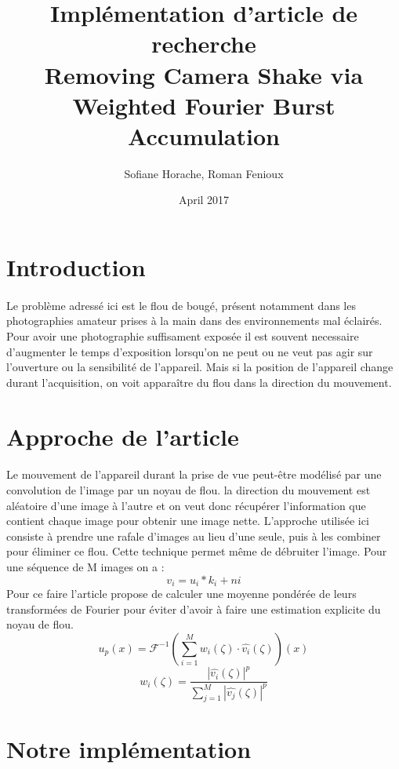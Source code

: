 \documentclass[a4paper,10pt]{report}
\title{Implémentation d'article de recherche \\ 
Removing Camera Shake via Weighted Fourier Burst Accumulation}
\author{Sofiane Horache, Roman Fenioux}
\date{April 2017}
\begin{document}
\maketitle

\setcounter{secnumdepth}{0}

\section{Introduction}
\paragraph{}
Le problème adressé ici est le flou de bougé, présent notamment dans les photographies 
amateur prises à la main dans des environnements mal éclairés. Pour avoir une photographie 
suffisament exposée il est souvent necessaire d'augmenter le temps d'exposition lorsqu'on 
ne peut ou ne veut pas agir sur l'ouverture ou la sensibilité de l'appareil. Mais si la 
position de l'appareil change durant l'acquisition, on voit apparaître du flou dans la direction
du mouvement. 

\section{Approche de l'article}
\paragraph{}
Le mouvement de l'appareil durant la prise de vue peut-être modélisé par une convolution de l'image
par un noyau de flou. la direction du mouvement est aléatoire d'une image à l'autre et on veut donc 
récupérer l'information que contient chaque image pour obtenir une image nette. L'approche utilisée 
ici consiste à prendre une rafale d'images au lieu d'une seule, puis à les combiner pour éliminer ce 
flou. Cette technique permet même de débruiter l'image. Pour une séquence de M images on a :
\[
  v_{i} = u_{i} \ast k_{i} + n{i}
\]
Pour ce faire l'article propose de calculer une moyenne pondérée de leurs transformées 
de Fourier pour éviter d'avoir à faire une estimation explicite du noyau de flou.
\[
  u_{p}(x) = \mathcal{F}^{-1}\left(\sum_{i=1}^M w_{i}(\zeta)\cdot \hat{v_{i}}(\zeta)\right)(x)
\]
\[
  w_{i}(\zeta) = \frac{|\hat{v_{i}}(\zeta)|^p}{\sum_{j=1}^M |\hat{v_{j}}(\zeta)|^p}
\]

\section{Notre implémentation}
\end{document}
